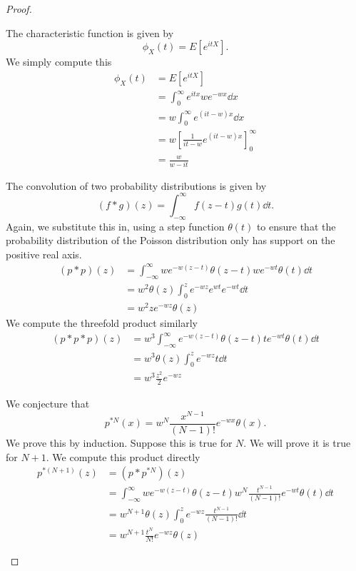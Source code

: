 \begin{proof}
	\begin{parts}
	\item The characteristic function is given by
		\[
			\phi_X(t) = E[e^{itX}]
		.\] 
		We simply compute this
		\begin{align*}
			\phi_X(t) &= E[e^{itX}] \\
				  &= \int_0^\infty e^{itx}we^{-wx}\dd{x} \\
				  &= w \int_0^\infty e^{(it-w)x}\dd{x} \\
				  &= w\left[ \frac{1}{it-w}e^{(it-w)x} \right]_0^\infty  \\
				  &= \frac{w}{w-it}
		\end{align*}
	\item The convolution of two probability distributions is given by
		\[
			(f*g)(z)=\int_{-\infty}^\infty f(z-t)g(t)\dd{t}
		.\] 
		Again, we substitute this in, using a step function $\theta(t)$ to ensure that the probability distribution of the Poisson distribution only has support on the positive real axis.
		\begin{align*}
			(p*p)(z) &= \int_{-\infty}^\infty we^{-w(z-t)}\theta(z-t)we^{-wt}\theta(t) \dd{t}\\
				 &= w^2 \theta(z)\int_0^z e^{-wz}e^{wt}e^{-wt}\dd{t} \\
				 &= w^2 ze^{-wz} \theta(z)
		\end{align*}
		We compute the threefold product similarly
		\begin{align*}
			(p*p*p)(z) &= w^3 \int_{-\infty}^\infty e^{-w(z-t)}\theta(z-t)te^{-wt}\theta(t)\dd{t} \\
				   &= w^3 \theta(z)\int_0^z e^{-wz}t\dd{t}\\
				   &= w^3 \frac{z^2}{2}e^{-wz} 
		\end{align*}
	\item We conjecture that
		\[
			p^{*N}(x) = w^N \frac{x^{N-1}}{(N-1)!}e^{-wx}\theta(x) 
		.\] 
		We prove this by induction. Suppose this is true for $N$. We will prove it is true for $N+ 1$. We compute this product directly
		\begin{align*}
			p^{*(N+1)}(z) &= (p*p^{*N})(z) \\
				      &= \int_{-\infty}^\infty we^{-w(z-t)}\theta(z-t)w^N \frac{t^{N-1}}{(N-1)!}e^{-wt}\theta(t)\dd{t} \\
				      &= w^{N+1} \theta(z)\int_0^z e^{-wz} \frac{t^{N-1}}{(N-1)!}\dd{t} \\
				      &= w^{N+1} \frac{t^{N}}{N!}e^{-wz}\theta(z)

\end{align*}
\end{parts}
\end{proof}
